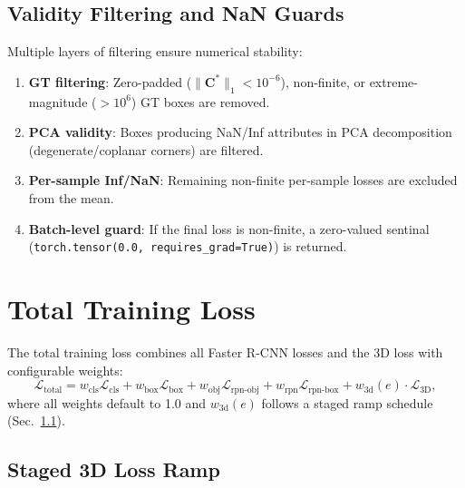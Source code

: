 \documentclass[runningheads]{llncs}
\newcommand{\mat}[1]{\bm{#1}}
\begin{document}
\subsection{Validity Filtering and NaN Guards}

Multiple layers of filtering ensure numerical stability:
\begin{enumerate}
    \item \textbf{GT filtering}: Zero-padded ($\|\mat{C}^*\|_1 < 10^{-6}$), non-finite, or extreme-magnitude ($>10^6$) GT boxes are removed.
    \item \textbf{PCA validity}: Boxes producing NaN/Inf attributes in PCA decomposition (degenerate/coplanar corners) are filtered.
    \item \textbf{Per-sample Inf/NaN}: Remaining non-finite per-sample losses are excluded from the mean.
    \item \textbf{Batch-level guard}: If the final loss is non-finite, a zero-valued sentinal (\texttt{torch.tensor(0.0, requires\_grad=True)}) is returned.
\end{enumerate}


\section{Total Training Loss}
\label{sec:total_loss}

The total training loss combines all Faster R-CNN losses and the 3D loss with configurable weights:
\begin{equation}
    \mathcal{L}_{\text{total}} = w_{\text{cls}} \mathcal{L}_{\text{cls}} + w_{\text{box}} \mathcal{L}_{\text{box}} + w_{\text{obj}} \mathcal{L}_{\text{rpn-obj}} + w_{\text{rpn}} \mathcal{L}_{\text{rpn-box}} + w_{\text{3d}}(e) \cdot \mathcal{L}_{\text{3D}},
    \label{eq:total_loss}
\end{equation}
where all weights default to 1.0 and $w_{\text{3d}}(e)$ follows a staged ramp schedule (Sec.~\ref{sec:ramp}).

\subsection{Staged 3D Loss Ramp}
\label{sec:ramp}
\end{document}
